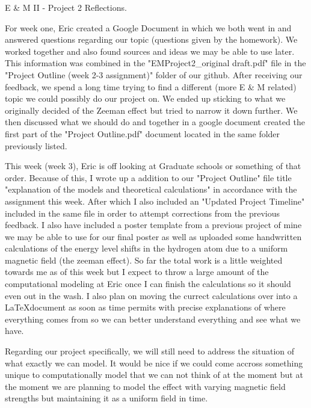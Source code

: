 \documentclass[11pt]{article}
\begin{document}
 

\begin{center}
	{\Large E \& M II - Project 2 Reflections.}
\end{center}

For week one, Eric created a Google Document in which we both went in and answered questions regarding our topic (questions given by the homework). We worked together and also found sources and ideas we may be able to use later. This information was combined in the "EMProject2\_original draft.pdf" file in the "Project Outline (week 2-3 assignment)" folder of our github. After receiving our feedback, we spend a long time trying to find a different (more E \& M related) topic we could possibly do our project on. We ended up sticking to what we originally decided of the Zeeman effect but tried to narrow it down further. We then discussed what we should do and together in a google document created the first part of the "Project Outline.pdf" document located in the same folder previously listed. 

This week (week 3), Eric is off looking at Graduate schools or something of that order. Because of this, I wrote up a addition to our "Project Outline" file title "explanation of the models and theoretical calculations" in accordance with the assignment this week. After which I also included an "Updated Project Timeline" included in the same file in order to attempt corrections from the previous feedback. I also have included a poster template from a previous project of mine we may be able to use for our final poster as well as uploaded some handwritten calculations of the energy level shifts in the hydrogen atom due to a uniform magnetic field (the zeeman effect). So far the total work is a little weighted towards me as of this week but I expect to throw a large amount of the computational modeling at Eric once I can finish the calculations so it should even out in the wash. I also plan on moving the currect calculations over into a \LaTeX document as soon as time permits with precise explanations of where everything comes from so we can better understand everything and see what we have.

Regarding our project specifically, we will still need to address the situation of what exactly we can model. It would be nice if we could come accross something unique to computationally model that we can not think of at the moment but at the moment we are planning to model the effect with varying magnetic field strengths but maintaining it as a uniform field in time. 


\end{document}
